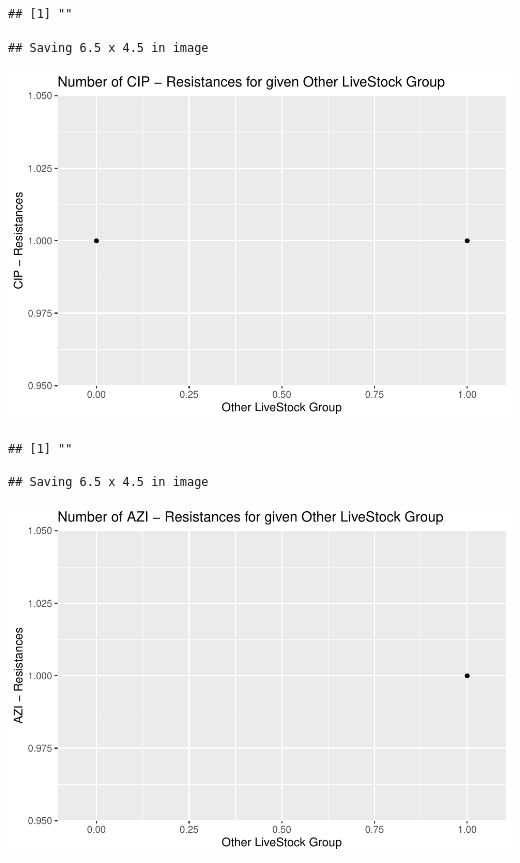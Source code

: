 \documentclass[
]{article}
\begin{document}
\begin{verbatim}
## [1] ""
\end{verbatim}

\begin{verbatim}
## Saving 6.5 x 4.5 in image
\end{verbatim}

\includegraphics{NResistenzen_files/figure-latex/binary_or_nominal_variables-12.pdf}

\begin{verbatim}
## [1] ""
\end{verbatim}

\begin{verbatim}
## Saving 6.5 x 4.5 in image
\end{verbatim}

\includegraphics{NResistenzen_files/figure-latex/binary_or_nominal_variables-13.pdf}
\end{document}
